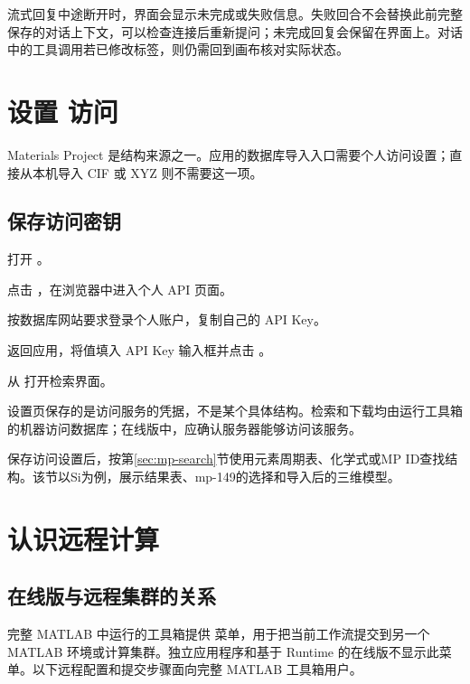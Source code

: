 流式回复中途断开时，界面会显示未完成或失败信息。失败回合不会替换此前完整保存的对话上下文，可以检查连接后重新提问；未完成回复会保留在界面上。对话中的工具调用若已修改标签，则仍需回到画布核对实际状态。


\section{设置  访问}

Materials Project 是结构来源之一。应用的数据库导入入口需要个人访问设置；直接从本机导入 CIF 或 XYZ 则不需要这一项。

\subsection{保存访问密钥}

\begin{steps}
\item 打开 。
\item 点击 ，在浏览器中进入个人 API 页面。
\item 按数据库网站要求登录个人账户，复制自己的 API Key。
\item 返回应用，将值填入 API Key 输入框并点击 。
\item 从  打开检索界面。
\end{steps}

设置页保存的是访问服务的凭据，不是某个具体结构。检索和下载均由运行工具箱的机器访问数据库；在线版中，应确认服务器能够访问该服务。

保存访问设置后，按第\ref{sec:mp-search}节使用元素周期表、化学式或MP ID查找结构。该节以Si为例，展示结果表、mp-149的选择和导入后的三维模型。

\section{认识远程计算}

\subsection{在线版与远程集群的关系}

完整 MATLAB\regmark{} 中运行的工具箱提供  菜单，用于把当前工作流提交到另一个 MATLAB\regmark{} 环境或计算集群。独立应用程序和基于 Runtime 的在线版不显示此菜单。以下远程配置和提交步骤面向完整 MATLAB\regmark{} 工具箱用户。


